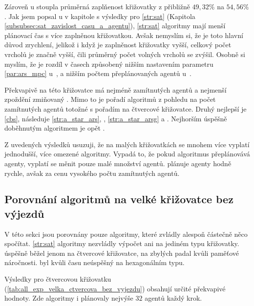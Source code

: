 Zároveň u  stoupla průměrná zaplňenost křižovatky z přibližně $49,32\%$ na $54,56\%$.
Jak jsem popsal u v kapitole s výsledky pro \ref{str:sat} (Kapitola \ref{subsubsec:sat_zavislost_casu_a_agentu}),
\ref{str:sat} algoritmy mají menší plánovací čas s více zaplněnou křižovatkou.
Avšak nemyslím si, že je toto hlavní důvod zrychlení, jelikož i když je zaplněnost křižovatky vyšší,
celkový počet vrcholů je značně vyšší, čili průměrný počet volných vrcholů se zvýšil.
Osobně si myslím, že je rozdíl v časech způsobený nižším nastavením parametru \ref{par:ars_mpc}
u~, a nižším počtem přeplánovaných agentů u~.

Překvapivě na této křižovatce má nejméně zamítnutých agentů a nejmenší zpoždění zmiňovaný .
Mimo to je pořadí algoritmů z pohledu na počet zamítnutých agentů totožné s pořadím na čtvercové křižovatce.
Druhý nejlepší je \ref{cbs}, následuje \ref{str:a_star_ars}, , \ref{str:a_star_arsg}
a .
Nejhorším úspěšně doběhnutým algoritmem je opět .



Z uvedených výsledků usuzuji, že na malých křižovatkách se mnohem více vyplatí jednodušší, více omezené algoritmy.
Vypadá to, že pokud algoritmus přeplánovává agenty, vyplatí se měnit pouze malé množství agentů.
 plánuje agenty hodně rychle, avšak za cenu vysokého počtu zamítnutých agentů.

\subsection{Porovnání algoritmů na velké křižovatce bez výjezdů}
\label{subsec:porovnani_algoritmu_na_velke_krizovatce_bez_vyjezdu}

V této sekci jsou porovnány pouze algoritmy, které zvládly alespoň částečně něco spočítat.
\ref{str:sat} algoritmy nezvládly výpočet ani na jediném typu křižovatky.
 úspěšně běžel jenom na čtvercové křižovatce, na zbylých padal kvůli paměťové náročnosti.
 byl kvůli času neúspěšný na hexagonálním typu.

Výsledky pro čtvercovou křižovatku (\ref{tab:all_exp_velka_ctvercova_bez_vyjezdu}) obsahují určité překvapivé hodnoty.
Zde algoritmy  i  plánovaly nejvýše $32$ agentů každý krok.

